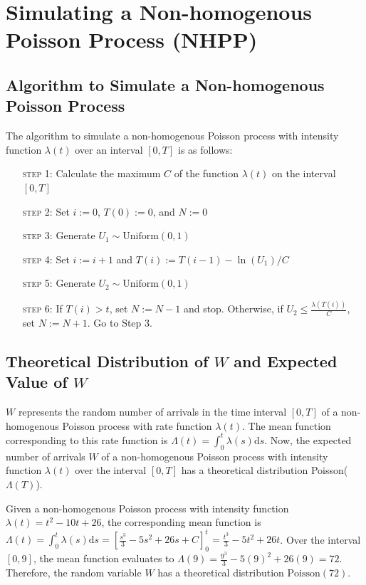 \documentclass[11pt, oneside]{article}   	%
\begin{document}
\section{Simulating a Non-homogenous Poisson Process (NHPP)}
\subsection{Algorithm to Simulate a Non-homogenous Poisson Process}
The algorithm to simulate a non-homogenous Poisson process with intensity function $\lambda(t)$ over an interval $[0,T]$ is as follows:
\begin{enumerate}[leftmargin=30pt,labelindent=65pt,itemindent=30pt]
\item[\textsc{step 1:}] Calculate the maximum $C$ of the function $\lambda(t)$ on the interval $[0,T]$
\item[\textsc{step 2:}] Set $i:=0$, $T(0):=0$, and $N:=0$
\item[\textsc{step 3:}] Generate $U_1 \sim \text{Uniform}(0,1)$
\item[\textsc{step 4:}] Set $i:=i+1$ and $T(i) := T(i-1) - \ln(U_1)/C$
\item[\textsc{step 5:}] Generate $U_2 \sim\text{Uniform}(0,1)$
\item[\textsc{step 6:}] If $T(i) > t$, set $N:=N-1$ and stop. Otherwise, if $U_2 \leq \frac{\lambda(T(i))}{C}$, set $N:=N+1$. Go to Step 3.
\end{enumerate}

\subsection{Theoretical Distribution of $W$ and Expected Value of $W$}
$W$ represents the random number of arrivals in the time interval $[0, T]$ of a non-homogenous Poisson process with rate function $\lambda(t)$. The mean function corresponding to this rate function is $\Lambda(t) = \int_{0}^{t}\lambda(s)\mathrm{d}s $. Now, the expected number of arrivals $W$ of a non-homogenous Poisson process with intensity function $\lambda(t)$ over the interval $[0, T]$ has a theoretical distribution Poisson($\Lambda(T)$).

Given a non-homogenous Poisson process with intensity function $\lambda(t)=t^2-10t+26$, the corresponding mean function is $\Lambda(t)=\int_{0}^{t}\lambda(s)\mathrm{d}s=\left[\frac{s^3}{3} - 5s^2 + 26s + C\right]_{0}^{t} =\frac{t^3}{3}-5t^2+26t$. Over the interval $[0,9]$, the mean function evaluates to $\Lambda(9)=\frac{9^3}{3} - 5(9)^2+26(9) = 72$. Therefore, the random variable $W$ has a theoretical distribution $\text{Poisson}(72)$.
\end{document}
